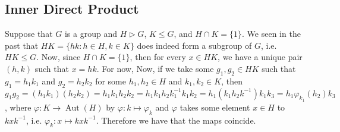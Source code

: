 \documentclass[9pt,reqno]{amsart}
\theoremstyle{definition}
\DeclareMathOperator{\aut}{Aut}
\newcommand{\lmt}{\longmapsto}
\begin{document}
\subsection{Inner Direct Product} 
Suppose that $G$ is a group and $H \triangleright G$, $K \leq G$, and $H \cap K = \{ 1 \}$. We seen in the past that $HK = \{ hk \colon h \in H, k \in K \}$ does indeed form a subgroup of $G$, i.e. $HK \leq G$. Now, since $H \cap K = \{ 1 \}$, then for every $x \in HK$, we have a unique pair $(h, k)$ such that $x = hk$. For now, Now, if we take some $g_1, g_2 \in HK$ such that $g_1 = h_1 k_1$ and $g_2 = h_2 k_2$ for some $h_1, h_2 \in H$ and $k_1, k_2 \in K$, then $g_1 g_2 = (h_1 k_1) (h_2 k_2) = h_1 k_1 h_2 k_2 = h_1 k_1 h_2 k_1 ^{-1} k_1 k_2 = h_1 (k_1 h_2 k^{-1}) k_1 k_3 = h_1 \varphi_{k_1} (h_2) k_3$, where $\varphi \colon K \longrightarrow \aut (H)$ by $ \varphi \colon k \longmapsto \varphi_k$ and $\varphi$ takes some element $x \in H$ to $kxk^{-1}$, i.e. $\varphi_k  \colon x \lmt kxk^{-1}$. Therefore we have that the maps coincide. 
\end{document}

